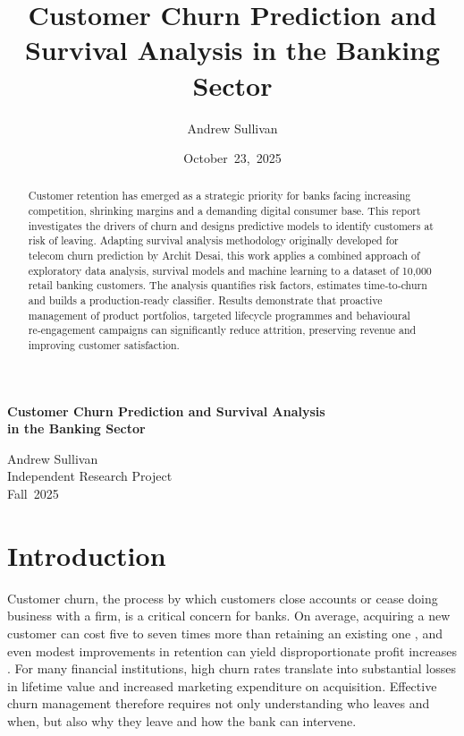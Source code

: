 \documentclass[12pt]{article}
\title{Customer Churn Prediction and Survival Analysis in the Banking Sector}
\author{Andrew Sullivan}
\date{October~23,~2025}
\begin{document}
\begin{titlepage}
  \centering
  \vspace*{2cm}
  \Huge\textbf{Customer Churn Prediction and Survival Analysis\\in the Banking Sector}
  \vspace{1.5cm}

  \large
  Andrew Sullivan\\[0.5cm]
  Independent Research Project\\[0.5cm]
  Fall~2025
  
  \vfill
\end{titlepage}

\newpage
\begin{abstract}
Customer retention has emerged as a strategic priority for banks facing increasing competition, shrinking margins and a demanding digital consumer base.  This report investigates the drivers of churn and designs predictive models to identify customers at risk of leaving.  Adapting survival analysis methodology originally developed for telecom churn prediction by Archit Desai, this work applies a combined approach of exploratory data analysis, survival models and machine learning to a dataset of 10,000 retail banking customers.  The analysis quantifies risk factors, estimates time‑to‑churn and builds a production‑ready classifier.  Results demonstrate that proactive management of product portfolios, targeted lifecycle programmes and behavioural re‑engagement campaigns can significantly reduce attrition, preserving revenue and improving customer satisfaction.
\end{abstract}

\newpage
{}
\tableofcontents
\newpage
{}

\section{Introduction}
Customer churn, the process by which customers close accounts or cease doing business with a firm, is a critical concern for banks.  On average, acquiring a new customer can cost five to seven times more than retaining an existing one \citep{businessbuilders2024cost}, and even modest improvements in retention can yield disproportionate profit increases \citep{kumar2022customerretention}.  For many financial institutions, high churn rates translate into substantial losses in lifetime value and increased marketing expenditure on acquisition.  Effective churn management therefore requires not only understanding who leaves and when, but also why they leave and how the bank can intervene.
\end{document}
